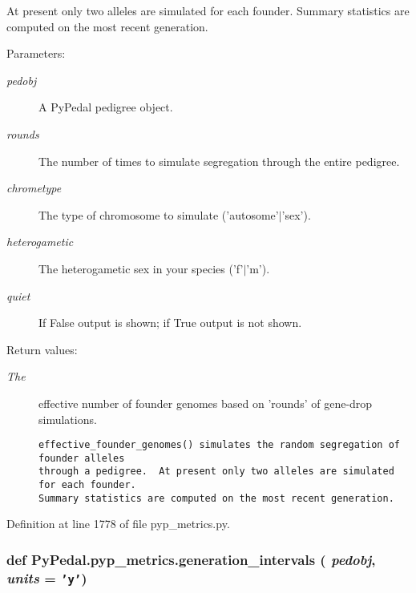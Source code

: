 At present only two alleles are simulated for each founder. Summary statistics are computed on the most recent generation. \begin{Desc}
\item[Parameters:]
\begin{description}
\item[{\em pedobj}]A Py\-Pedal pedigree object. \item[{\em rounds}]The number of times to simulate segregation through the entire pedigree. \item[{\em chrometype}]The type of chromosome to simulate ('autosome'$|$'sex'). \item[{\em heterogametic}]The heterogametic sex in your species ('f'$|$'m'). \item[{\em quiet}]If False output is shown; if True output is not shown. \end{description}
\end{Desc}
\begin{Desc}
\item[Return values:]
\begin{description}
\item[{\em The}]effective number of founder genomes based on 'rounds' of gene-drop simulations.

\footnotesize\begin{verbatim}effective_founder_genomes() simulates the random segregation of founder alleles
through a pedigree.  At present only two alleles are simulated for each founder.
Summary statistics are computed on the most recent generation.
\end{verbatim}
\normalsize
 \end{description}
\end{Desc}


Definition at line 1778 of file pyp\_\-metrics.py.\hypertarget{namespacePyPedal_1_1pyp__metrics_4fc7310e1c6484240ec0571a654cc64a}{
\subsubsection[generation\_\-intervals]{\setlength{\rightskip}{0pt plus 5cm}def Py\-Pedal.pyp\_\-metrics.generation\_\-intervals ( {\em pedobj},  {\em units} = {\tt 'y'})}}
\label{namespacePyPedal_1_1pyp__metrics_4fc7310e1c6484240ec0571a654cc64a}



